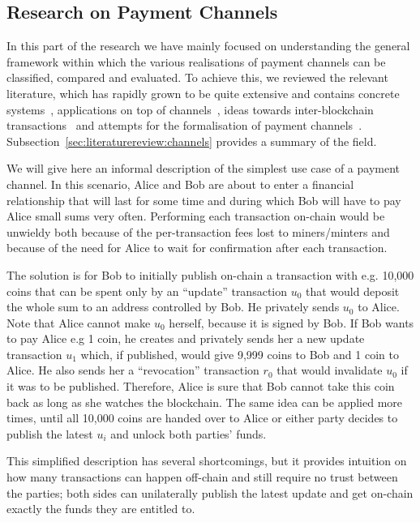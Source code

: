 \subsection{Research on Payment Channels}
\label{sec:channels}
  In this part of the research we have mainly focused on understanding the general
  framework within which the various realisations of payment channels can be classified,
  compared and evaluated. To achieve this, we reviewed the relevant literature, which has
  rapidly grown to be quite extensive and contains concrete
  systems~\cite{lightning,perun,teechan,duplexchannels,anonchannels,spriteschannels,fulgorrayo,bolt},
  applications on top of channels~\cite{blindsigncoins}, ideas towards inter-blockchain
  transactions~\cite{atomicswaps} and attempts for the formalisation
  of payment channels~\cite{statechannels}. Subsection~\ref{sec:literaturereview:channels}
  provides a summary of the field.

  We will give here an informal description of the simplest use case of a payment channel.
  In this scenario, Alice and Bob are about to enter a financial relationship that will
  last for some time and during which Bob will have to pay Alice small sums very often.
  Performing each transaction on-chain would be unwieldy both because of the
  per-transaction fees lost to miners/minters and because of the need for Alice to wait
  for confirmation after each transaction.

  The solution is for Bob to initially publish on-chain a transaction with e.g. 10,000
  coins that can be spent only by an ``update'' transaction $u_0$ that would deposit the
  whole sum to an address controlled by Bob. He privately sends $u_0$ to Alice. Note that
  Alice cannot make $u_0$ herself, because it is signed by Bob. If Bob wants to pay Alice
  e.g 1 coin, he creates and privately sends her a new update transaction $u_1$ which, if
  published, would give 9,999 coins to Bob and 1 coin to Alice. He also sends her a
  ``revocation'' transaction $r_0$ that would invalidate $u_0$ if it was to be published.
  Therefore, Alice is sure that Bob cannot take this coin back as long as she watches the
  blockchain. The same idea can be applied more times, until all 10,000 coins are handed
  over to Alice or either party decides to publish the latest $u_i$ and unlock both
  parties' funds.

  This simplified description has several shortcomings, but it provides intuition on how
  many transactions can happen off-chain and still require no trust between the parties;
  both sides can unilaterally publish the latest update and get on-chain exactly the funds
  they are entitled to.

